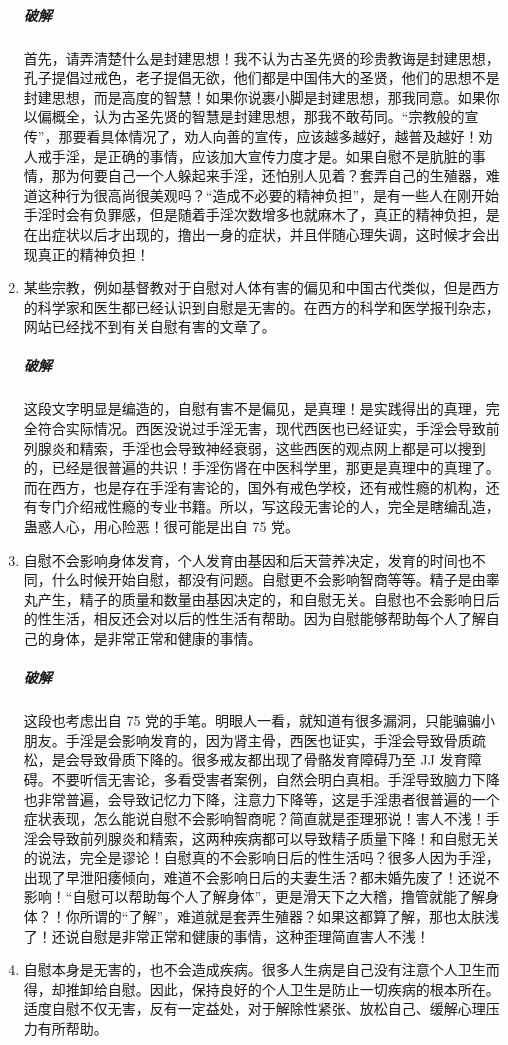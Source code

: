 \documentclass{ctexart}
\begin{document}
\begin{enumerate}
    \subparagraph{破解} 首先，请弄清楚什么是封建思想！我不认为古圣先贤的珍贵教诲是封建思想，孔子提倡过戒色，老子提倡无欲，他们都是中国伟大的圣贤，他们的思想不是封建思想，而是高度的智慧！如果你说裹小脚是封建思想，那我同意。如果你以偏概全，认为古圣先贤的智慧是封建思想，那我不敢苟同。“宗教般的宣传”，那要看具体情况了，劝人向善的宣传，应该越多越好，越普及越好！劝人戒手淫，是正确的事情，应该加大宣传力度才是。如果自慰不是肮脏的事情，那为何要自己一个人躲起来手淫，还怕别人见着？套弄自己的生殖器，难道这种行为很高尚很美观吗？“造成不必要的精神负担”，是有一些人在刚开始手淫时会有负罪感，但是随着手淫次数增多也就麻木了，真正的精神负担，是在出症状以后才出现的，撸出一身的症状，并且伴随心理失调，这时候才会出现真正的精神负担！
    \item 某些宗教，例如基督教对于自慰对人体有害的偏见和中国古代类似，但是西方的科学家和医生都已经认识到自慰是无害的。在西方的科学和医学报刊杂志，网站已经找不到有关自慰有害的文章了。
    \subparagraph{破解} 这段文字明显是编造的，自慰有害不是偏见，是真理！是实践得出的真理，完全符合实际情况。西医没说过手淫无害，现代西医也已经证实，手淫会导致前列腺炎和精索，手淫也会导致神经衰弱，这些西医的观点网上都是可以搜到的，已经是很普遍的共识！手淫伤肾在中医科学里，那更是真理中的真理了。而在西方，也是存在手淫有害论的，国外有戒色学校，还有戒性瘾的机构，还有专门介绍戒性瘾的专业书籍。所以，写这段无害论的人，完全是瞎编乱造，蛊惑人心，用心险恶！很可能是出自 75 党。
    \item 自慰不会影响身体发育，个人发育由基因和后天营养决定，发育的时间也不同，什么时候开始自慰，都没有问题。自慰更不会影响智商等等。精子是由睾丸产生，精子的质量和数量由基因决定的，和自慰无关。自慰也不会影响日后的性生活，相反还会对以后的性生活有帮助。因为自慰能够帮助每个人了解自己的身体，是非常正常和健康的事情。
    \subparagraph{破解} 这段也考虑出自 75 党的手笔。明眼人一看，就知道有很多漏洞，只能骗骗小朋友。手淫是会影响发育的，因为肾主骨，西医也证实，手淫会导致骨质疏松，是会导致骨质下降的。很多戒友都出现了骨骼发育障碍乃至 JJ 发育障碍。不要听信无害论，多看受害者案例，自然会明白真相。手淫导致脑力下降也非常普遍，会导致记忆力下降，注意力下降等，这是手淫患者很普遍的一个症状表现，怎么能说自慰不会影响智商呢？简直就是歪理邪说！害人不浅！手淫会导致前列腺炎和精索，这两种疾病都可以导致精子质量下降！和自慰无关的说法，完全是谬论！自慰真的不会影响日后的性生活吗？很多人因为手淫，出现了早泄阳痿倾向，难道不会影响日后的夫妻生活？都未婚先废了！还说不影响！“自慰可以帮助每个人了解身体”，更是滑天下之大稽，撸管就能了解身体？！你所谓的“了解”，难道就是套弄生殖器？如果这都算了解，那也太肤浅了！还说自慰是非常正常和健康的事情，这种歪理简直害人不浅！
    \item 自慰本身是无害的，也不会造成疾病。很多人生病是自己没有注意个人卫生而得，却推卸给自慰。因此，保持良好的个人卫生是防止一切疾病的根本所在。适度自慰不仅无害，反有一定益处，对于解除性紧张、放松自己、缓解心理压力有所帮助。

\end{enumerate}
\end{document}
